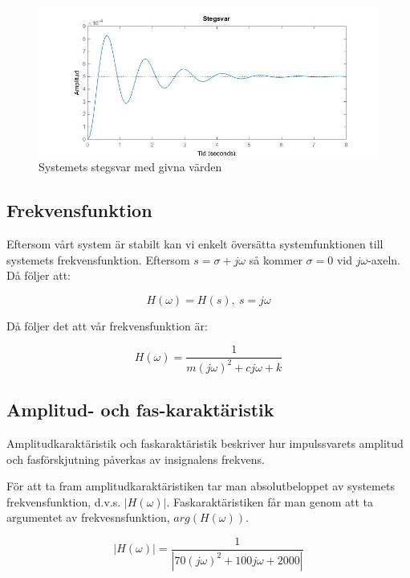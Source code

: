\documentclass[10pt,a4paper]{article}
\begin{document}
\begin{figure}
\begin{center}
\includegraphics[scale=0.5]{Stegsvar}
\caption{Systemets stegsvar med givna värden}
\end{center}
\end{figure}

\subsection{Frekvensfunktion}
Eftersom vårt system är stabilt kan vi enkelt översätta systemfunktionen till systemets frekvensfunktion. Eftersom $s = \sigma + j\omega$ så kommer $\sigma = 0$ vid $j\omega$-axeln. Då följer att:

\begin{equation}
H(\omega) = H(s), \  s = j\omega
\end{equation}

Då följer det att vår frekvensfunktion är:

\begin{equation}
H(\omega) =  \frac{1}{m (j\omega)^2 + c  j\omega + k}
\end{equation}


\subsection{Amplitud- och fas-karaktäristik}

Amplitudkaraktäristik och faskaraktäristik beskriver hur impulssvarets amplitud och fasförskjutning påverkas av insignalens frekvens.

För att ta fram amplitudkaraktäristiken tar man absolutbeloppet av systemets frekvensfunktion, d.v.s. $|H(\omega)|$. Faskaraktäristiken får man genom att ta argumentet av frekvesnsfunktion, $arg(H(\omega))$. 

\begin{equation}
|H(\omega)| = \frac{1}{|70 (j\omega)^2 + 100  j\omega + 2000|}
\end{equation}
\end{document}
